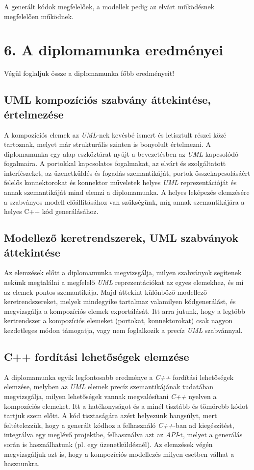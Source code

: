 \documentclass[a4paper,12pt]{report}
\begin{document}
A generált kódok megfelelőek, a modellek pedig az elvárt működésnek megfelelően működnek.

\chapter*{6. A diplomamunka eredményei}

Végül foglaljuk össze a diplomamunka főbb eredményeit!
\section{UML kompozíciós szabvány áttekintése, értelmezése}
A kompozíciós elemek az \textit{UML}-nek kevésbé ismert és letisztult részei közé tartoznak, melyet már strukturális szinten is bonyolult értelmezni. A diplomamunka egy alap eszköztárat nyújt a bevezetésben az \textit{UML} kapcsolódó fogalmaira. A portokkal kapcsolatos fogalmakat, az elvárt és szolgáltatott interfészeket, az üzenetküldés és fogadás szemantikáját, portok összekapcsolásáért felelős konnektorokat és konnektor műveletek helyes \textit{UML} reprezentációját és annak szemantikáját mind elemzi a diplomamunka. A helyes leképezés elemzésére a szabványos modell előállításához van szükségünk, míg annak szemantikájára a helyes C++ kód generálásához.

\section{Modellező keretrendszerek, UML szabványok áttekintése}
Az elemzések előtt a diplomamunka megvizsgálja, milyen szabványok segítenek nekünk megtalálni a megfelelő \textit{UML} reprezentációkat az egyes elemekhez, és mi az elemek pontos szemantikája. Majd áttekint különböző modellező keretrendszereket, melyek mindegyike tartalmaz valamilyen kódgenerálást, és megvizsgálja a kompozíciós elemek exportálását. Itt arra jutunk, hogy a legtöbb kertrendszer a kompozíciós elemeket (portokat, konnektorokat) csak nagyon kezdetleges módon támogatja, vagy nem foglalkozik a precíz \textit{UML} szabvánnyal.

\section{C++ fordítási lehetőségek elemzése}
A diplomamunka egyik legfontosabb eredménye a \textit{C++} fordítási lehetőségek elemzése, melyben az \textit{UML} elemek precíz szemantikájának tudatában megvizsgálja, milyen lehetőségek vannak megvalósítani \textit{C++} nyelven a kompozíciós elemeket. Itt a hatékonyságot és a minél tisztább és tömörebb kódot tartjuk szem előtt. A kód tisztaságára azért helyezünk hangsúlyt, mert feltételezzük, hogy a generált kódhoz a felhasználó \textit{C++}-ban ad kiegészítést, integrálva egy meglévő projektbe, felhasználva azt az \textit{API}-t, melyet a generálás során is használhatunk (pl. egy üzenetküldésnél). Az elemzések végén megvizsgáljuk azt is, hogy a kompozíciós modellezés milyen esetben válhat a hasznunkra.
\end{document}
